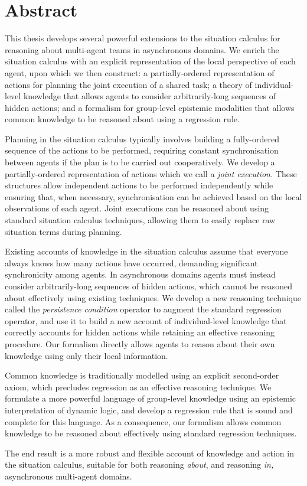 

\chapter*{Abstract}

This thesis develops several powerful extensions to the situation
calculus for reasoning about multi-agent teams in asynchronous domains.
We enrich the situation calculus with an explicit representation of
the local perspective of each agent, upon which we then construct:
 a partially-ordered
representation of actions for planning the joint execution of a shared
task; a theory of individual-level knowledge that allows agents to
consider arbitrarily-long sequences of hidden actions; and a formalism
for group-level epistemic modalities that allows common knowledge to be
reasoned about using a regression rule.

Planning in the situation calculus typically involves building
a fully-ordered sequence of the actions to be performed, requiring
constant synchronisation between agents if the plan is to be carried
out cooperatively. We develop a partially-ordered representation of
actions which we call a \emph{joint execution.} These structures allow
independent actions to be performed independently while ensuring that,
when necessary, synchronisation can be achieved based on the local
observations of each agent. Joint executions can be reasoned about
using standard situation calculus techniques, allowing them to easily
replace raw situation terms during planning.

Existing accounts of knowledge in the situation calculus assume that
everyone always knows how many actions have occurred, demanding significant
synchronicity among agents. In asynchronous domains agents must instead
consider arbitrarily-long sequences of hidden actions, which cannot
be reasoned about effectively using existing techniques. We develop
a new reasoning technique called the \emph{persistence condition}
operator to augment the standard regression operator, and use it to
build a new account of individual-level knowledge that correctly accounts
for hidden actions while retaining an effective reasoning procedure.
Our formalism directly allows agents to reason about their own knowledge
using only their local information.

Common knowledge is traditionally modelled using an explicit second-order
axiom, which precludes regression as an effective reasoning technique.
We formulate a more powerful language of group-level knowledge using
an epistemic interpretation of dynamic logic, and develop a regression
rule that is sound and complete for this language. As a consequence,
our formalism allows common knowledge to be reasoned about effectively
using standard regression techniques.

The end result is a more robust and flexible account of knowledge
and action in the situation calculus, suitable for both reasoning \emph{about},
and reasoning \emph{in,} asynchronous multi-agent domains.

